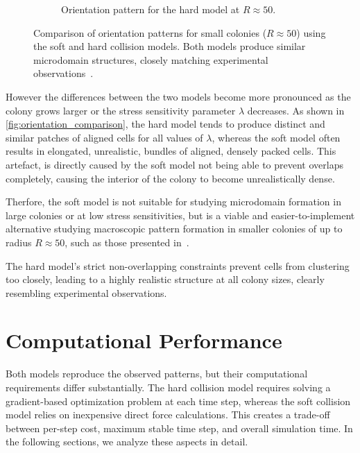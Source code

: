 \documentclass[conference]{IEEEtran}
\begin{document}
\begin{figure}[h]
\begin{subfigure}[b]{0.49\columnwidth}
        \caption{Orientation pattern for the hard model at $R \approx 50$.}
        \label{fig:packing_soft}
    \end{subfigure}
    \caption{Comparison of orientation patterns for small colonies ($R \approx 50$) using the soft and hard collision models. Both models produce similar microdomain structures, closely matching experimental observations~\cite{You2018}.}
    \label{fig:orientation_comparison_small}
\end{figure}

However the differences between the two models become more pronounced as the colony grows larger or the stress sensitivity parameter $\lambda$ decreases. As shown in \autoref{fig:orientation_comparison}, the hard model tends to produce distinct and similar patches of aligned cells for all values of $\lambda$, whereas the soft model often results in elongated, unrealistic, bundles of aligned, densely packed cells. This artefact, is directly caused by the soft model not being able to prevent overlaps completely, causing the interior of the colony to become unrealistically dense.

Therfore, the soft model is not suitable for studying microdomain formation in large colonies or at low stress sensitivities, but is a viable and easier-to-implement alternative studying macroscopic pattern formation in smaller colonies of up to radius $R \approx 50$, such as those presented in~\cite{You2018}.

The hard model's strict non-overlapping constraints prevent cells from clustering too closely, leading to a highly realistic structure at all colony sizes, clearly resembling experimental observations.



\clearpage
\newpage



\section{Computational Performance}

Both models reproduce the observed patterns, but their computational requirements differ substantially. The hard collision model requires solving a gradient-based optimization problem at each time step, whereas the soft collision model relies on inexpensive direct force calculations. This creates a trade-off between per-step cost, maximum stable time step, and overall simulation time. In the following sections, we analyze these aspects in detail.
\end{document}
